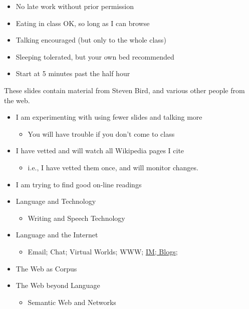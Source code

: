 \documentclass[a4paper,landscape,headrule,footrule,xetex]{foils}
\begin{document}

\begin{itemize}
\item No late work without prior permission
\item Eating in class OK, so long as I can browse
\item Talking encouraged (but only to the whole class)
\item Sleeping tolerated, but your own bed recommended
\item Start at 5 minutes past the half hour
\end{itemize}


These slides contain material from Steven Bird, and various other people from the web.

\begin{itemize}
\item I am experimenting with using fewer slides and talking more
  \begin{itemize}
  \item You will have trouble if you don't come to class
  \end{itemize}
\item I have vetted and will watch all Wikipedia pages I cite
  \begin{itemize}
  \item i.e., I have vetted them once, and will monitor changes.
  \end{itemize}
\item I am trying to find good on-line readings
\end{itemize}



\begin{itemize}
\item Language and Technology
  \begin{itemize}
  \item Writing and Speech Technology
  \end{itemize}
\item Language and the Internet
  \begin{itemize}
  \item Email; Chat; Virtual Worlds; WWW; \ul{IM; Blogs}; 
  \end{itemize}
\item The Web as Corpus
\item The Web beyond Language
  \begin{itemize}
  \item Semantic Web and Networks
  \end{itemize}
\end{itemize}
\end{document}
